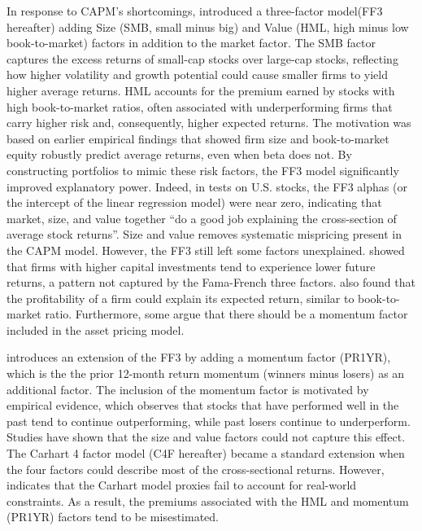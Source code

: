 In response to CAPM's shortcomings,  introduced a three-factor model(FF3 hereafter) adding Size (SMB, small minus big) and Value (HML, high minus low book-to-market) factors in addition to the market factor. The SMB factor captures the excess returns of small-cap stocks over large-cap stocks, reflecting how higher volatility and growth potential could cause smaller firms to yield higher average returns. HML accounts for the premium earned by stocks with high book-to-market ratios, often associated with underperforming firms that carry higher risk and, consequently, higher expected returns. The motivation was based on earlier empirical findings that showed firm size and book-to-market equity robustly predict average returns, even when beta does not. By constructing portfolios to mimic these risk factors, the FF3 model significantly improved explanatory power. Indeed, in tests on U.S. stocks, the FF3 alphas (or the intercept of the linear regression model) were near zero, indicating that market, size, and value together “do a good job explaining the cross-section of average stock returns”. Size and value removes systematic mispricing present in the CAPM model. However, the FF3 still left some factors unexplained.  showed that firms with higher capital investments tend to experience lower future returns, a pattern not captured by the Fama-French three factors.  also found that the profitability of a firm could explain its expected return, similar to book-to-market ratio. Furthermore, some argue that there should be a momentum factor included in the asset pricing model.

 introduces an extension of the FF3 by adding a momentum factor (PR1YR), which is the  the prior 12-month return momentum (winners minus losers) as an additional factor. The inclusion of the momentum factor is motivated by empirical evidence, which observes that stocks that have performed well in the past tend to continue outperforming, while past losers continue to underperform. Studies have shown that the size and value factors could not capture this effect. The Carhart 4 factor model (C4F hereafter) became a standard extension when the four factors could describe most of the cross-sectional returns. However,  indicates that the Carhart model proxies fail to account for real-world constraints. As a result, the premiums associated with the HML and momentum (PR1YR) factors tend to be misestimated.

